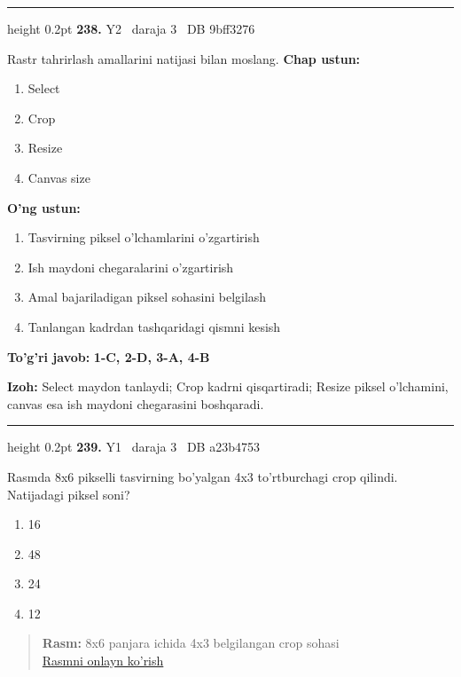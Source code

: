 \documentclass[10pt,a4paper,oneside]{article}
\begin{document}
\vspace{2mm}\hrule height 0.2pt \vspace{4mm}
\hypertarget{q238}{\textbf{\color{ink}238.}}  {\color{muted}\scriptsize Y2 \textbullet\ daraja 3 \textbullet\ DB 9bff3276}
\par
Rastr tahrirlash amallarini natijasi bilan moslang.
\textbf{\footnotesize Chap ustun:}
\begin{enumerate}[label=\arabic*),leftmargin=9mm]
\item Select
\item Crop
\item Resize
\item Canvas size
\end{enumerate}
\textbf{\footnotesize O'ng ustun:}
\begin{enumerate}[label=\Alph*),leftmargin=9mm]
\item Tasvirning piksel o'lchamlarini o'zgartirish
\item Ish maydoni chegaralarini o'zgartirish
\item Amal bajariladigan piksel sohasini belgilash
\item Tanlangan kadrdan tashqaridagi qismni kesish
\end{enumerate}
\begin{tcolorbox}[enhanced,breakable,colback=teal!4,colframe=teal!45!black,boxrule=0.45pt,arc=1.2mm,left=2.8mm,right=2.8mm,top=2mm,bottom=2mm,before skip=2mm,after skip=2mm]
\textbf{\color{teal}To'g'ri javob:} \textbf{1-C, 2-D, 3-A, 4-B}
\par\smallskip
\textbf{Izoh:} Select maydon tanlaydi; Crop kadrni qisqartiradi; Resize piksel o'lchamini, canvas esa ish maydoni chegarasini boshqaradi.
\end{tcolorbox}
\vspace{2mm}\hrule height 0.2pt \vspace{4mm}
\hypertarget{q239}{\textbf{\color{ink}239.}}  {\color{muted}\scriptsize Y1 \textbullet\ daraja 3 \textbullet\ DB a23b4753}
\par
Rasmda 8x6 pikselli tasvirning bo'yalgan 4x3 to'rtburchagi crop qilindi. Natijadagi piksel soni?
\begin{enumerate}[label=\Alph*),leftmargin=9mm]
\item 16
\item 48
\item 24
\item 12
\end{enumerate}
\begin{quote}\footnotesize\color{muted}\textbf{Rasm:} 8x6 panjara ichida 4x3 belgilangan crop sohasi\\
\href{https://github.com/sarvar9417/attestatsiya/blob/main/public/graphics-web-v2/crop_grid.svg}{Rasmni onlayn ko'rish}
\end{quote}
\end{document}
